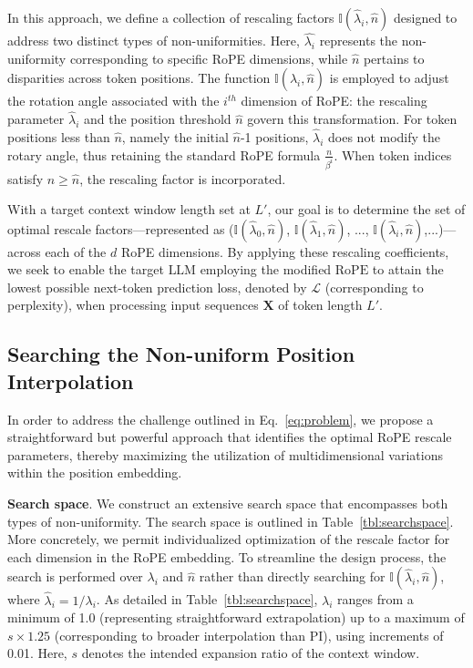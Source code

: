 In this approach, we define a collection of rescaling factors $\mathbb{I}(\hat{\lambda}_{i},\hat{n})$ designed to address two distinct types of non-uniformities. Here, $\hat{\lambda_i}$ represents the non-uniformity corresponding to specific RoPE dimensions, while $\hat{n}$ pertains to disparities across token positions. The function $\mathbb{I}(\hat{\lambda}_{i},\hat{n})$ is employed to adjust the rotation angle associated with the $i^{th}$ dimension of RoPE: the rescaling parameter $\hat\lambda_{i}$ and the position threshold $\hat{n}$ govern this transformation. For token positions less than $\hat{n}$, namely the initial $\hat{n}$-1 positions, $\hat\lambda_{i}$ does not modify the rotary angle, thus retaining the standard RoPE formula $\frac{n}{\beta^i}$. When token indices satisfy $n\ge\hat{n}$, the rescaling factor is incorporated.

With a target context window length set at $L'$, our goal is to determine the set of optimal rescale factors—represented as ($\mathbb{I}(\hat{\lambda}_{0},\hat{n})$, $\mathbb{I}(\hat{\lambda}_{1},\hat{n})$, ..., $\mathbb{I}(\hat{\lambda}_{i},\hat{n})$,...)—across each of the $d$ RoPE dimensions. By applying these rescaling coefficients, we seek to enable the target $\text{LLM}$ employing the modified $\text{RoPE}$ to attain the lowest possible next-token prediction loss, denoted by $\mathcal{L}$ (corresponding to perplexity), when processing input sequences $\mathbf{X}$ of token length $L'$.

\subsection{Searching the Non-uniform Position Interpolation}

In order to address the challenge outlined in Eq.~\ref{eq:problem}, we propose a straightforward but powerful approach that identifies the optimal RoPE rescale parameters, thereby maximizing the utilization of multidimensional variations within the position embedding.

\textbf{Search space}. We construct an extensive search space that encompasses both types of non-uniformity. The search space is outlined in Table~\ref{tbl:searchspace}. More concretely, we permit individualized optimization of the rescale factor for each dimension in the RoPE embedding. To streamline the design process, the search is performed over $\lambda_i$ and $\hat{n}$ rather than directly searching for $\mathbb{I}(\hat{\lambda}_{i},\hat{n})$, where  $\hat{\lambda}_{i}=1/\lambda_i$. As detailed in Table~\ref{tbl:searchspace}, $\lambda_i$ ranges from a minimum of 1.0 (representing straightforward extrapolation) up to a maximum of $s\times1.25$ (corresponding to broader interpolation than PI), using increments of 0.01. Here, $s$ denotes the intended expansion ratio of the context window.

